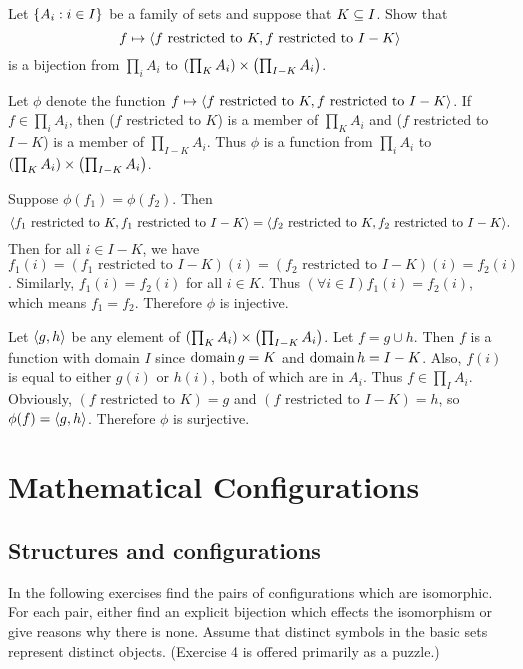 \documentclass{report}
\begin{document}
\begin{exercise}
Let $\left\{ A_i : i\in I \right\}$ be a family of sets and suppose that $K\subseteq I$.
Show that
\[f\mapsto \left\langle f\text{ restricted to }K, f\text{ restricted to }I - K\right\rangle\]
is a bijection from $\prod_i A_i$ to $\left(\prod_K A_i\right)\times\left(\prod_{I-K} A_i\right)$.
\end{exercise}

\begin{solution}
Let $\phi$ denote the function $f\mapsto \left\langle f\text{ restricted to }K, f\text{ restricted to }I - K\right\rangle$.
If $f\in \prod_i A_i$, then ($f$ restricted to $K$) is a member of $\prod_K A_i$ and
($f$ restricted to $I-K$) is a member of $\prod_{I-K} A_i$. Thus $\phi$ is a function from
$\prod_i A_i$ to $\left(\prod_K A_i\right)\times\left(\prod_{I-K} A_i\right)$.

Suppose $\phi(f_1)=\phi(f_2)$. Then
\[\aprn{f_1\text{ restricted to }K, f_1\text{ restricted to }I - K} = \aprn{f_2\text{ restricted to }K, f_2\text{ restricted to }I - K}.\]
Then for all $i\in I-K$, we have $f_1(i)=(f_1\text{ restricted to }I - K)(i)=(f_2\text{ restricted to }I - K)(i)=f_2(i)$.
Similarly, $f_1(i)=f_2(i)$ for all $i\in K$.
Thus $(\forall i\in I)f_1(i)=f_2(i)$, which means $f_1 = f_2$.
Therefore $\phi$ is injective.

Let $\left\langle g,h\right\rangle$ be any element of $\left(\prod_K A_i\right)\times\left(\prod_{I-K} A_i\right)$.
Let $f=g\cup h$. Then $f$ is a function with domain $I$ since $\operatorname{domain} g = K$ and $\operatorname{domain} h=I-K$.
Also, $f(i)$ is equal to either $g(i)$ or $h(i)$, both of which are in $A_i$.
Thus $f\in\prod_I A_i$. Obviously, $(f\text{ restricted to }K)=g$
and $(f\text{ restricted to }I-K)=h$, so $\phi(f)=\left\langle g, h\right\rangle$. Therefore $\phi$ is surjective.


\end{solution}

\chapter{Mathematical Configurations}
\section{Structures and configurations}

In the following exercises find the pairs of configurations which are isomorphic. For
each pair, either find an explicit bijection which effects the isomorphism or give reasons
why there is none. Assume that distinct symbols in the basic sets represent distinct
objects. (Exercise 4 is offered primarily as a puzzle.)
\end{document}
